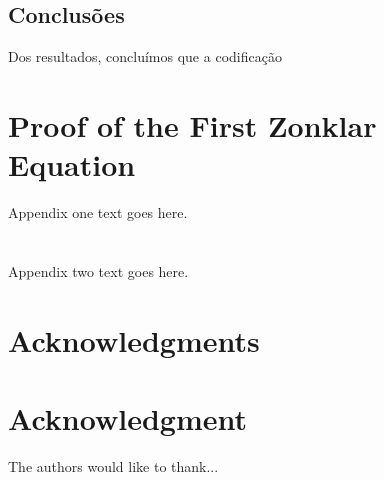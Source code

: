 \documentclass[12pt,journal,compsoc]{IEEEtran}
\begin{document}

\subsection{Conclusões}
Dos resultados, concluímos que a codificação



\appendices
\section{Proof of the First Zonklar Equation}
Appendix one text goes here.

\section{}
Appendix two text goes here.


\ifCLASSOPTIONcompsoc
  \section*{Acknowledgments}
\else
  \section*{Acknowledgment}
\fi

The authors would like to thank...

\ifCLASSOPTIONcaptionsoff
  \newpage
\fi


\footnotemark 


\end{document}
